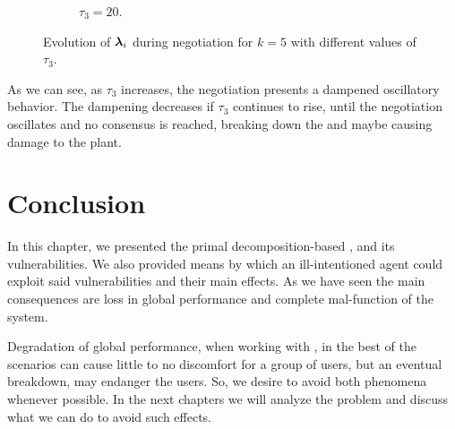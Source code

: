 \documentclass[../main.tex]{subfiles}
\begin{document}
\begin{figure}[h]
\begin{subfigure}{0.45\textwidth}
    \caption{$\tau_{3}=20$. }\label{fig:example_vary_tau_lambda_tau_20}
  \end{subfigure}
    \caption{Evolution of $\boldsymbol{\lambda}_i$ during negotiation for $k=5$ with different values of $\tau_{3}$.}\label{fig:example_vary_tau_lambda}
\end{figure}
As we can see, as $\tau_{3}$ increases, the negotiation presents a dampened oscillatory behavior.
The dampening decreases if $\tau_{3}$ continues to rise, until the negotiation oscillates and no consensus is reached, breaking down the \dmpc{} and maybe causing damage to the plant.

\section{Conclusion}\label{sec:conclusion}
In this chapter, we presented the primal decomposition-based \dmpc{}, and its vulnerabilities.
We also provided means by which an ill-intentioned agent could exploit said vulnerabilities and their main effects.
As we have seen the main consequences are loss in global performance and complete mal-function of the system.

Degradation of global performance, when working with \cps{}, in the best of the scenarios can cause little to no discomfort for a group of users, but an eventual breakdown, may endanger the users.
So, we desire to avoid both phenomena whenever possible.
In the next chapters we will analyze the problem and discuss what we can do to avoid such effects.
\end{document}
